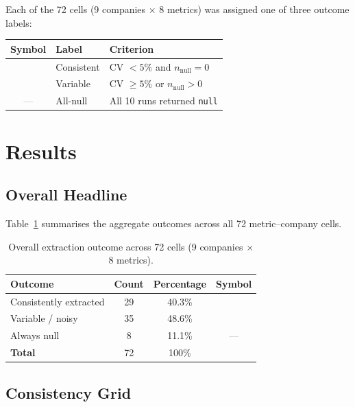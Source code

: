 \documentclass[12pt, a4paper]{article}
\newcommand{\cmark}{\textcolor{green!60!black}{\ding{51}}}  %
\newcommand{\xmark}{\textcolor{red!70!black}{\ding{55}}}    %
\newcommand{\nmark}{\textcolor{gray}{---}}                   %
\begin{document}
Each of the 72 cells (9 companies $\times$ 8 metrics) was assigned one of
three outcome labels:

\begin{center}
\begin{tabular}{clp{8cm}}
\toprule
\textbf{Symbol} & \textbf{Label} & \textbf{Criterion} \\
\midrule
\cmark & Consistent & CV $< 5\%$ and $n_{\text{null}} = 0$ \\
\xmark & Variable   & CV $\geq 5\%$ or $n_{\text{null}} > 0$ \\
\nmark & All-null   & All 10 runs returned \texttt{null} \\
\bottomrule
\end{tabular}
\end{center}

\section{Results}
\label{sec:results}

\subsection{Overall Headline}

Table~\ref{tab:headline} summarises the aggregate outcomes across all 72
metric--company cells.

\begin{table}[H]
\centering
\caption{Overall extraction outcome across 72 cells (9 companies $\times$ 8 metrics).}
\label{tab:headline}
\begin{tabular}{lccc}
\toprule
\textbf{Outcome}      & \textbf{Count} & \textbf{Percentage} & \textbf{Symbol} \\
\midrule
Consistently extracted & 29 & 40.3\% & \cmark \\
Variable / noisy       & 35 & 48.6\% & \xmark \\
Always null            &  8 & 11.1\% & \nmark \\
\midrule
\textbf{Total}         & 72 & 100\%  & \\
\bottomrule
\end{tabular}
\end{table}

\subsection{Consistency Grid}
\end{document}
